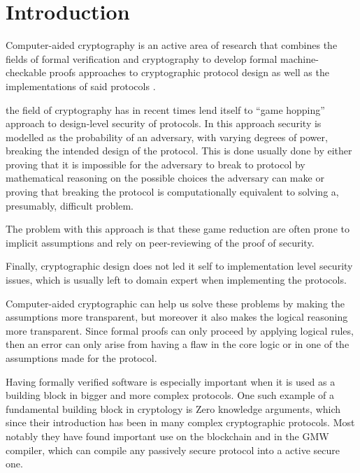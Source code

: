 \chapter{Introduction}
\label{ch:intro}


Computer-aided cryptography is an active area of research that combines the
fields of formal verification and cryptography to develop
formal machine-checkable proofs approaches to cryptographic protocol design as
well as the implementations of said protocols \cite{SOK:CAC}.


the field of cryptography has in recent times lend itself to ``game hopping''
approach to design-level security of protocols. In this approach security is
modelled as the probability of an adversary, with varying degrees of power,
breaking the intended design of the protocol. This is done usually done by
either proving that it is impossible for the adversary to break to protocol by
mathematical reasoning on the possible choices the adversary can make or
proving that breaking the protocol is computationally equivalent to
solving a, presumably, difficult problem.

The problem with this approach is that these game reduction are often prone to
implicit assumptions and rely on peer-reviewing of the proof of security.

Finally, cryptographic design does not led it self to implementation level
security issues, which is usually left to domain expert when implementing the
protocols.

Computer-aided cryptographic can help us solve these problems by making the
assumptions more transparent, but moreover it also makes the logical reasoning
more transparent. Since formal proofs can only proceed by applying logical
rules, then an error can only arise from having a flaw in the core logic or in
one of the assumptions made for the protocol.


Having formally verified software is especially important when it is used as a
building block in bigger and more complex protocols.
One such example of a fundamental building block in cryptology is Zero knowledge
arguments, which since their introduction has been in many complex cryptographic
protocols. Most notably they have found important use on the blockchain and in
the  GMW compiler, which can compile any passively secure protocol into a active
secure one.

